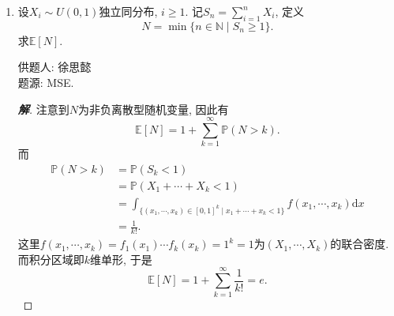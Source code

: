 \documentclass[lang=cn,12pt,a4paper]{elegantpaper}
\newenvironment{solution}{\begin{proof}[\bf 解]}{\end{proof}}
\begin{document}
\begin{enumerate}
	\begin{proof}
		\begin{enumerate}
			\item 由于可取$L/F$的正规闭包，故不妨设$L/F$为正规扩张。设$f$在$L$中不可约分解为$$f=\prod_{i=1}^k p_i^{mn_i}$$
			对任意$p_i$, 对任意$\sigma \in \mathrm{Gal}(L/F)$, $\sigma(p_i)$也必定在$f$的不可约分解中出现, 从而与某个$p_j$相差常数倍. 故$f$可分解为$$f=c\prod_{i=1}^s(\prod_{j=1}^{t_i} p_{ij}^{n_{i}})^m$$
			其中$c\in L$, $p_{i1},\dots ,p_{it_i}$为$\mathrm{Gal}(L/K)$的一个轨道. 由于$$\prod_{j=1}^{t_i} p_{ij}^{n_{i}}$$是$\mathrm{Gal}(L/K)$不变的，且因为$L/K$可分，故其属于$K[X_1,\dots,X_n]$. 对比系数可知$c\in K$.
		\end{enumerate}
	\end{proof}

	\item 设$X_i\sim U(0,1)$独立同分布, $i\geq 1$. 记$S_n=\sum_{i=1}^{n}X_i$, 定义
		\begin{equation*}
			N=\min\{n\in\mathbb{N}\mid S_n\geq 1\}.
		\end{equation*}
		求$\mathbb{E}[N]$.

	\begin{flushright}
		\kaishu
		供题人: 徐思懿\\
		题源: MSE.
	\end{flushright}

	\begin{solution}
		注意到$N$为非负离散型随机变量, 因此有
		\begin{equation*}
			\mathbb{E}[N]=1+\sum_{k=1}^{\infty}\mathbb{P}(N>k).
		\end{equation*}
		而
		\begin{align*}
			\mathbb{P}(N>k)&=\mathbb{P}(S_k<1)\\
			&=\mathbb{P}(X_1+\cdots+X_k<1)\\
			&=\int_{\{(x_1,\cdots,x_k)\in[0,1]^k\mid x_1+\cdots+x_k<1\}}f(x_1,\cdots,x_k)\mathrm{d}x\\
			&=\frac{1}{k!}.
		\end{align*}
		这里$f(x_1,\cdots,x_k)=f_1(x_1)\cdots f_k(x_k)=1^k=1$为$(X_1,\cdots,X_k)$的联合密度. 而积分区域即$k$维单形, 于是
		\begin{equation*}
			\mathbb{E}[N]=1+\sum_{k=1}^{\infty}\frac{1}{k!}=e.
		\end{equation*}
	\end{solution}
\end{enumerate}
\end{document}
